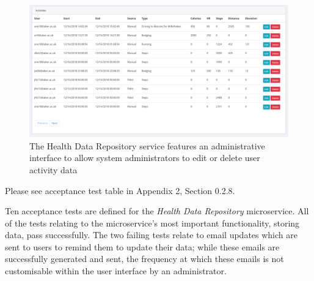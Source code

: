 \begin{figure}[H]
    \centering
    \includegraphics[width=\textwidth]{Images/service_health_data_repository.png}
    \caption{The Health Data Repository service features an administrative interface to allow system administrators to edit or delete user activity data}
\end{figure}

Please see acceptance test table in Appendix 2, Section 0.2.8.

Ten acceptance tests are defined for the \textit{Health Data Repository} microservice. All of the tests relating to the microservice's most important functionality, storing data, pass successfully. The two failing tests relate to email updates which are sent to users to remind them to update their data; while these emails are successfully generated and sent, the frequency at which these emails is not customisable within the user interface by an administrator. 